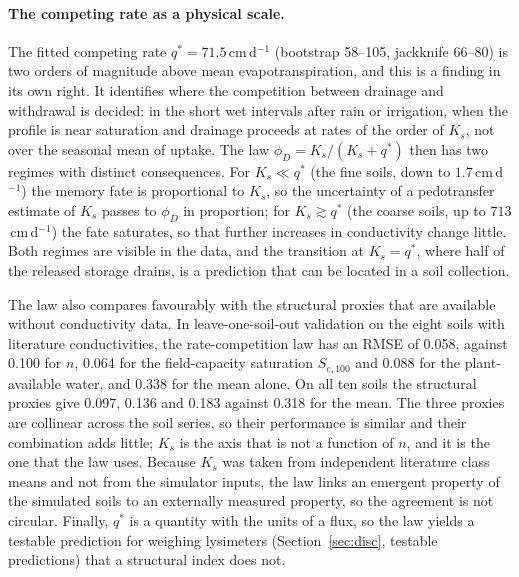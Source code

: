 \paragraph{The competing rate as a physical scale.}
The fitted competing rate $q^\ast=71.5$\,cm\,d$^{-1}$ (bootstrap 58--105, jackknife 66--80) is two orders of magnitude above mean evapotranspiration, and this is a finding in its own right. It identifies where the competition between drainage and withdrawal is decided: in the short wet intervals after rain or irrigation, when the profile is near saturation and drainage proceeds at rates of the order of $K_s$, not over the seasonal mean of uptake. The law $\phi_D=K_s/(K_s+q^\ast)$ then has two regimes with distinct consequences. For $K_s\ll q^\ast$ (the fine soils, down to $1.7$\,cm\,d$^{-1}$) the memory fate is proportional to $K_s$, so the uncertainty of a pedotransfer estimate of $K_s$ passes to $\phi_D$ in proportion; for $K_s\gtrsim q^\ast$ (the coarse soils, up to $713$\,cm\,d$^{-1}$) the fate saturates, so that further increases in conductivity change little. Both regimes are visible in the data, and the transition at $K_s=q^\ast$, where half of the released storage drains, is a prediction that can be located in a soil collection.

The law also compares favourably with the structural proxies that are available without conductivity data. In leave-one-soil-out validation on the eight soils with literature conductivities, the rate-competition law has an RMSE of 0.058, against 0.100 for $n$, 0.064 for the field-capacity saturation $S_{e,100}$ and 0.088 for the plant-available water, and 0.338 for the mean alone. On all ten soils the structural proxies give 0.097, 0.136 and 0.183 against 0.318 for the mean. The three proxies are collinear across the soil series, so their performance is similar and their combination adds little; $K_s$ is the axis that is not a function of $n$, and it is the one that the law uses. Because $K_s$ was taken from independent literature class means \citep{Carsel1988} and not from the simulator inputs, the law links an emergent property of the simulated soils to an externally measured property, so the agreement is not circular. Finally, $q^\ast$ is a quantity with the units of a flux, so the law yields a testable prediction for weighing lysimeters (Section~\ref{sec:disc}, testable predictions) that a structural index does not.

